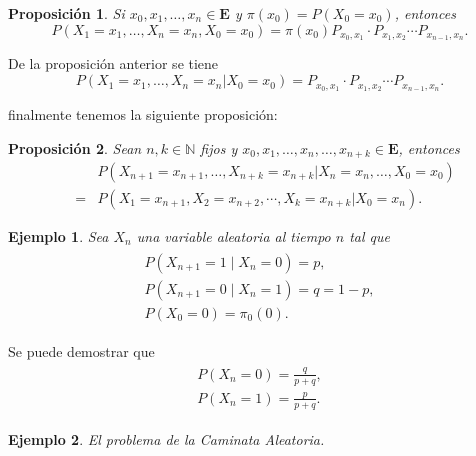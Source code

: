 \documentclass{article}
\newtheorem{Ejem}{Ejemplo}[section]
\newtheorem{Prop}{Proposición}[section]
\newcommand{\nat}{\mathbb{N}}
\newcommand{\Eb}{\mathbf{E}}
\numberwithin{equation}{section}
\begin{document}
\begin{Prop}
Si $x_{0},x_{1},\ldots,x_{n}\in \Eb$ y $\pi\left(x_{0}\right)=P\left(X_{0}=x_{0}\right)$, entonces
\begin{equation}
P\left(X_{1}=x_{1},\ldots,X_{n}=x_{n},X_{0}=x_{0}\right)=\pi\left(x_{0}\right)P_{x_{0},x_{1}}\cdot P_{x_{1},x_{2}}\cdots P_{x_{n-1},x_{n}}.
\end{equation}
\end{Prop}

De la proposici\'on anterior se tiene
\begin{equation}
P\left(X_{1}=x_{1},\ldots,X_{n}=x_{n}|X_{0}=x_{0}\right)=P_{x_{0},x_{1}}\cdot P_{x_{1},x_{2}}\cdots P_{x_{n-1},x_{n}}.
\end{equation}

finalmente tenemos la siguiente proposici\'on:

\begin{Prop}
Sean $n,k\in\nat$ fijos y $x_{0},x_{1},\ldots,x_{n},\ldots,x_{n+k}\in\Eb$, entonces
\begin{eqnarray*}
&&P\left(X_{n+1}=x_{n+1},\ldots,X_{n+k}=x_{n+k}|X_{n}=x_{n},\ldots,X_{0}=x_{0}\right)\\
&=&P\left(X_{1}=x_{n+1},X_{2}=x_{n+2},\cdots,X_{k}=x_{n+k}|X_{0}=x_{n}\right).
\end{eqnarray*}
\end{Prop}


\begin{Ejem}
Sea $X_{n}$ una variable aleatoria al tiempo $n$ tal que
\begin{eqnarray}
\begin{array}{l}
P\left(X_{n+1}=1 \mid X_{n}=0\right)=p,\\
P\left(X_{n+1}=0 \mid X_{n}=1\right)=q=1-p,\\
P\left(X_{0}=0\right)=\pi_{0}\left(0\right).
\end{array}
\end{eqnarray}

\end{Ejem}

Se puede demostrar que
\begin{eqnarray}
\begin{array}{l}
P\left(X_{n}=0\right)=\frac{q}{p+q},\\
P\left(X_{n}=1\right)=\frac{p}{p+q}.
\end{array}
\end{eqnarray}

\begin{Ejem}
El problema de la Caminata Aleatoria.
\end{Ejem}
\end{document}
